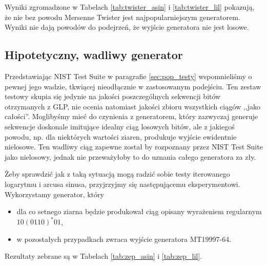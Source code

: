 \documentclass[a4paper,11pt,twoside]{book}
\theoremstyle{definition}
\begin{document}
Wyniki zgromadzone w Tabelach \ref{tab:twister_asin} i \ref{tab:twister_lil} pokazują, że nie bez powodu Mersenne Twister jest najpopularniejszym generatorem. Wyniki nie dają powodów do podejrzeń, że wyjście generatora nie jest losowe.

\FloatBarrier
\subsection{Hipotetyczny, wadliwy generator}
\label{subsec:zepsuty}
Przedstawiając NIST Test Suite w paragrafie \ref{sec:pop_testy} wspomnieliśmy o pewnej jego wadzie, tkwiącej nieodłącznie w zastosowanym podejściu. Ten zestaw testowy skupia się jedynie na jakości poszczególnych sekwencji bitów otrzymanych z GLP, nie ocenia natomiast jakości zbioru wszystkich ciągów ,,jako całości''. Moglibyśmy mieć do czynienia z generatorem, który zazwyczaj generuje sekwencje doskonale imitujące idealny ciąg losowych bitów, ale z jakiegoś powodu, np. dla niektórych wartości ziaren, produkuje wyjście ewidentnie nielosowe. Ten wadliwy ciąg zapewne został by rozpoznany przez NIST Test Suite jako nielosowy, jednak nie przeważyłoby to do uznania całego generatora za zły.

Żeby sprawdzić jak z taką sytuacją mogą radzić sobie testy iterowanego logarytmu i arcusa sinusa, przyjrzyjmy się następującemu eksperymentowi. Wykorzystamy generator, który
\begin{itemize}
  \setlength\itemsep{1pt}
 \item dla co setnego ziarna będzie produkował ciąg opisany wyrażeniem regularnym $10(0110)^*01$,
 \item w pozostałych przypadkach zwraca wyjście generatora MT19997-64.
\end{itemize}
Rezultaty zebrane są w Tabelach \ref{tab:zep_asin} i \ref{tab:zep_lil}.
\end{document}
